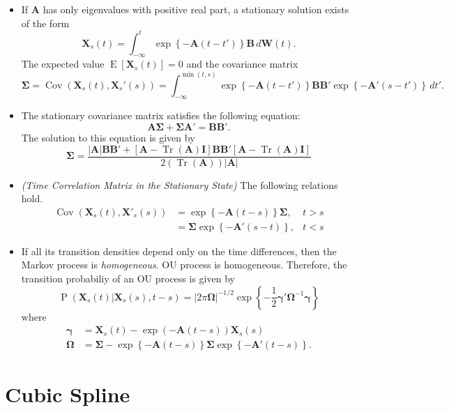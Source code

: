 \documentclass[11pt]{article}
\DeclareMathOperator{\Tr}{Tr}
\newcommand{\bs}{\boldsymbol}
\newcommand{\opn}{\operatorname}
\begin{document}
\begin{itemize}
  \item If $\bs{A}$ has only eigenvalues with positive real part, a stationary solution exists of the form
  \begin{equation}
    \bs{X}_{s}\left(t\right) = \int_{-\infty}^{t}\exp\left\{-\bs{A}\left(t-t'\right) \right\}\bs{B}\,d\bs{W}\left(t\right).
  \end{equation}
  The expected value $\opn{E}\left[\bs{X}_{s}\left(t\right)\right] = 0$ and the covariance matrix
  \begin{equation}
    \bs{\Sigma} = \opn{Cov}\left(\bs{X}_{s}\left(t\right), \bs{X}_{s}'\left(s\right)\right) = \int_{-\infty}^{\min\left(t,s\right)}\exp\left\{-\bs{A}\left(t-t'\right) \right\}\bs{BB}'\exp\left\{-\bs{A}'\left(s-t'\right) \right\}\,dt'.
  \end{equation}
  \item The stationary covariance matrix satisfies the following equation:
  \begin{equation}
    \bs{A\Sigma} + \bs{\Sigma A}' = \bs{BB}'.
  \end{equation}
  The solution to this equation is given by
  \begin{equation}
    \bs{\Sigma} = \frac{\left|\bs{A}\right|\bs{BB}' + \left[\bs{A}-\Tr\left(\bs{A}\right)\bs{I} \right]\bs{BB}'\left[\bs{A}-\Tr\left(\bs{A}\right)\bs{I}\right]}{2\left(\Tr\left(\bs{A}\right)\right)\left|\bs{A}\right|}
  \end{equation}
  \item \emph{(Time Correlation Matrix in the Stationary State)} The following relations hold.
  \begin{align}
    \opn{Cov}\left(\bs{X}_{s}\left(t\right), \bs{X}'_{s}\left(s\right)\right) &= \exp\left\{-\bs{A}\left(t-s\right) \right\}\bs{\Sigma}, & t>s \\
    &= \bs{\Sigma}\exp\left\{-\bs{A}'\left(s-t\right) \right\}, & t<s
  \end{align}
  \item If all its transition densities depend only on the time differences, then the Markov process is \emph{homogeneous}. OU process is homogeneous. Therefore, the transition probabiliy of an OU process is given by
  \begin{equation}
    \opn{P}\left(\bs{X}_{s}\left(t\right)|\bs{X}_{s}\left(s\right), t-s\right) = \left|2\pi\bs{\Omega}\right|^{-1/2}\exp\left\{-\frac{1}{2}\bs{\gamma}'\bs{\Omega}^{-1}\bs{\gamma} \right\}
  \end{equation}
  where
  \begin{align}
    \bs{\gamma} &= \bs{X}_{s}\left(t\right) -\exp\left(-\bs{A}\left(t-s\right)\right)\bs{X}_{s}\left(s\right) \\
    \bs{\Omega} &=  \bs{\Sigma} -\exp\left\{-\bs{A}\left(t-s\right) \right\}\bs{\Sigma}\exp\left\{-\bs{A}'\left(t-s\right)\right\}.
  \end{align}
\end{itemize}
\section{Cubic Spline}
\end{document}
